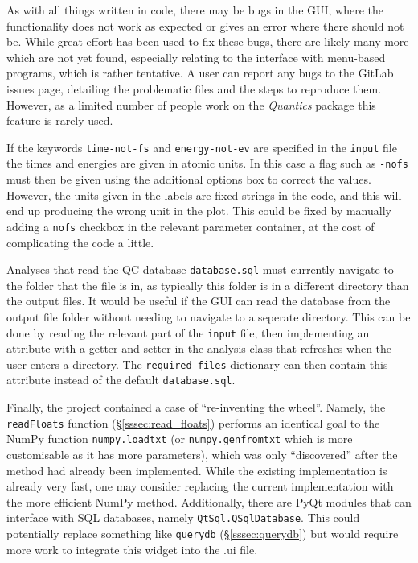 \documentclass[12pt]{article}
\begin{document}
As with all things written in code, there may be bugs in the GUI, where the functionality does not work as expected or gives an error where there should not be. While great effort has been used to fix these bugs, there are likely many more which are not yet found, especially relating to the interface with menu-based programs, which is rather tentative. A user can report any bugs to the GitLab issues page, detailing the problematic files and the steps to reproduce them. However, as a limited number of people work on the \textit{Quantics} package this feature is rarely used.

If the keywords \texttt{time-not-fs} and \texttt{energy-not-ev} are specified in the \texttt{input} file the times and energies are given in atomic units. In this case a flag such as \texttt{-nofs} must then be given using the additional options box to correct the values. However, the units given in the labels are fixed strings in the code, and this will end up producing the wrong unit in the plot. This could be fixed by manually adding a \texttt{nofs} checkbox in the relevant parameter container, at the cost of complicating the code a little.

Analyses that read the QC database \texttt{database.sql} must currently navigate to the folder that the file is in, as typically this folder is in a different directory than the output files. It would be useful if the GUI can read the database from the output file folder without needing to navigate to a seperate directory. This can be done by reading the relevant part of the \texttt{input} file, then implementing an attribute with a getter and setter in the analysis class that refreshes when the user enters a directory. The \texttt{required\_files} dictionary can then contain this attribute instead of the default \texttt{database.sql}.

Finally, the project contained a case of ``re-inventing the wheel''. Namely, the \texttt{readFloats} function (\S\ref{sssec:read_floats}) performs an identical goal to the NumPy function \texttt{numpy.loadtxt} (or \texttt{numpy.genfromtxt} which is more customisable as it has more parameters), which was only ``discovered'' after the method had already been implemented. While the existing implementation is already very fast, one may consider replacing the current implementation with the more efficient NumPy method. Additionally, there are PyQt modules that can interface with SQL databases, namely \texttt{QtSql.QSqlDatabase}. This could potentially replace something like \texttt{querydb} (\S\ref{sssec:querydb}) but would require more work to integrate this widget into the .ui file.
\end{document}
